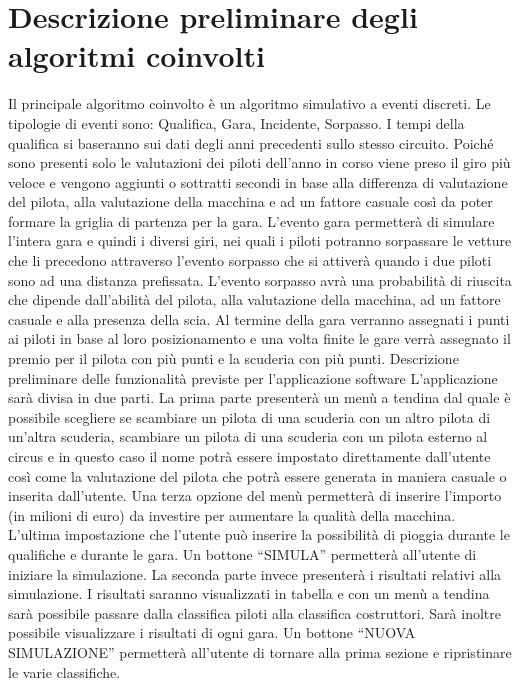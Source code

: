\section[Descrizione preliminare degli algoritmi coinvolti]{Descrizione preliminare degli algoritmi coinvolti} %
Il principale algoritmo coinvolto è un algoritmo simulativo a eventi discreti. Le tipologie di eventi sono: Qualifica, Gara, Incidente, Sorpasso. I tempi della qualifica si baseranno sui dati degli anni precedenti sullo stesso circuito. Poiché sono presenti solo le valutazioni dei piloti dell’anno in corso viene preso il giro più veloce e vengono aggiunti o sottratti secondi in base alla differenza di valutazione del pilota, alla valutazione della macchina e ad un fattore casuale così da poter formare la griglia di partenza per la gara. L’evento gara permetterà di simulare l’intera gara e quindi i diversi giri, nei quali i piloti potranno sorpassare le vetture che li precedono attraverso l’evento sorpasso che si attiverà quando i due piloti sono ad una distanza prefissata. L’evento sorpasso avrà una probabilità di riuscita che dipende dall’abilità del pilota, alla valutazione della macchina, ad un fattore casuale e alla presenza della scia. Al termine della gara verranno assegnati i punti ai piloti in base al loro posizionamento e una volta finite le gare verrà assegnato il premio per il pilota con più punti e la scuderia con più punti.
Descrizione preliminare delle funzionalità previste per l’applicazione software
L’applicazione sarà divisa in due parti. 
La prima parte presenterà un menù a tendina dal quale è possibile scegliere se scambiare un pilota di una scuderia con un altro pilota di un’altra scuderia, scambiare un pilota di una scuderia con un pilota esterno al circus e in questo caso il nome potrà essere impostato direttamente dall’utente così come la valutazione del pilota che potrà essere generata in maniera casuale o inserita dall’utente. Una terza opzione del menù permetterà di inserire l’importo (in milioni di euro) da investire per aumentare la qualità della macchina. L’ultima impostazione che l’utente può inserire la possibilità di pioggia durante le qualifiche e durante le gara. Un bottone “SIMULA” permetterà all’utente di iniziare la simulazione.
La seconda parte invece presenterà i risultati relativi alla simulazione. I risultati saranno visualizzati in tabella e con un menù a tendina sarà possibile passare dalla classifica piloti alla classifica costruttori. Sarà inoltre possibile visualizzare i risultati di ogni gara. Un bottone “NUOVA SIMULAZIONE” permetterà all’utente di tornare alla prima sezione e ripristinare le varie classifiche.

